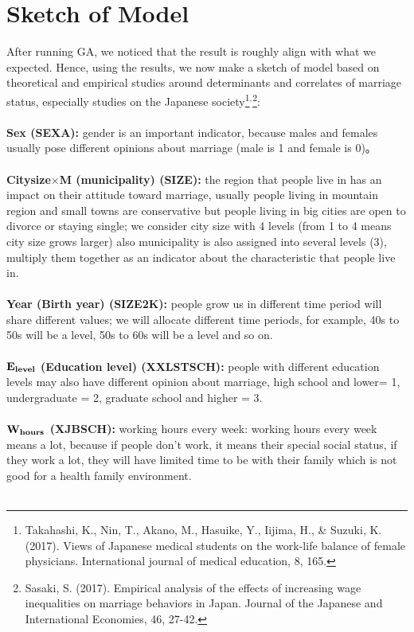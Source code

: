 \documentclass[12pt]{article}
\begin{document}
	\section{Sketch of Model}
	After running GA, we noticed that the result is roughly align with what we expected. Hence, using the results, we now make a sketch of model based on theoretical and empirical studies around determinants and correlates of marriage status, especially studies on the Japanese society\footnote{Takahashi, K., Nin, T., Akano, M., Hasuike, Y., Iijima, H., \& Suzuki, K. (2017). Views of Japanese medical students on the work-life balance of female physicians. International journal of medical education, 8, 165.}$^,$\footnote{Sasaki, S. (2017). Empirical analysis of the effects of increasing wage inequalities on marriage behaviors in Japan. Journal of the Japanese and International Economies, 46, 27-42.}:\\\\
	\textbf{Sex (SEXA):} gender is an important indicator, because males and females usually pose different opinions about marriage (male is 1 and female is 0)。\\\\
	\textbf{Citysize$\times$M (municipality) (SIZE):} the region that people live in has an impact on their attitude toward marriage, usually people living in mountain region and small towns are conservative but people living in big cities are open to divorce or staying single; we consider city size with 4 levels (from 1 to 4 means city size grows larger) also municipality is also assigned into several levels (3), multiply them together as an indicator about the characteristic that people live in.\\\\
	\textbf{Year (Birth year) (SIZE2K):} people grow us in different time period will share different values; we will allocate different time periods, for example, 40s to 50s will be a level, 50s to 60s will be a level and so on.\\\\
	\textbf{$\bf{E_{level}}$ (Education level) (XXLSTSCH):} people with different education levels may also have different opinion about marriage, high school  and lower= 1, undergraduate = 2, graduate school and higher = 3.\\\\
	\textbf{$\bf{W_{hours}}$ (XJBSCH):} working hours every week: working hours every week means a lot, because if people don’t work, it means their special social status, if they work a lot, they will have limited time to be with their family which is not good for a health family environment.\\\\
\end{document}
